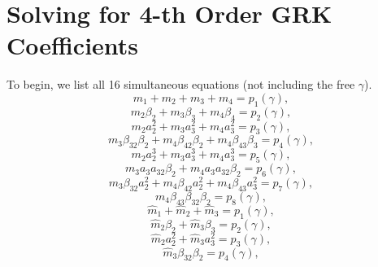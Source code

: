 \documentclass{ansconf}
\numberwithin{equation}{section}
\begin{document}
\section{Solving for 4-th Order GRK Coefficients}\label{app:order}

To begin, we list all 16 simultaneous equations (not including the free $\gamma$).
\begin{equation}\label{eq:eq1}
   m_1 + m_2 + m_3 + m_4 = p_1\left(\gamma\right),
\end{equation}
\begin{equation}\label{eq:eq2}
   m_2\beta_2 + m_3\beta_3 + m_4\beta_4 = p_2\left(\gamma\right),
\end{equation}
\begin{equation}\label{eq:eq3}
   m_2a^2_2 + m_3a^2_3 + m_4a^2_3 = p_3\left(\gamma\right),
\end{equation}
\begin{equation}\label{eq:eq4}
   m_3\beta_{32}\beta_2 + m_4\beta_{42}\beta_2 + m_4\beta_{43}\beta_3 = p_4\left(\gamma\right),
\end{equation}
\begin{equation}\label{eq:eq5}
   m_2a^3_2 + m_3a^3_3 + m_4a^3_3 = p_5\left(\gamma\right),
\end{equation}
\begin{equation}\label{eq:eq6}
   m_3a_3a_{32}\beta_2 + m_4a_3a_{32}\beta_2 = p_6\left(\gamma\right),
\end{equation}
\begin{equation}\label{eq:eq7}
   m_3\beta_{32}a_2^2 + m_4\beta_{42}a_2^2 + m_4\beta_{43}a_3^2 = p_7\left(\gamma\right),
\end{equation}
\begin{equation}\label{eq:eq8}
   m_4\beta_{43}\beta_{32}\beta_2 = p_8\left(\gamma\right),
\end{equation}
\begin{equation}\label{eq:eq9}
     \hat{m}_1 + \hat{m}_2 + \hat{m}_3 = p_1\left(\gamma\right),
\end{equation}
\begin{equation}\label{eq:eq10}
     \hat{m}_2\beta_2 + \hat{m}_3\beta_3 = p_2\left(\gamma\right),
\end{equation}
\begin{equation}\label{eq:eq11}
     \hat{m}_2a^2_2 + \hat{m}_3a^2_3 = p_3\left(\gamma\right),
\end{equation}
\begin{equation}\label{eq:eq12}
     \hat{m}_3\beta_{32}\beta_2 = p_4\left(\gamma\right),
\end{equation}
\end{document}
